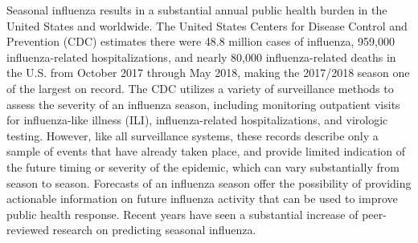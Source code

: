 \documentclass{article}\usepackage[]{graphicx}\usepackage[]{color}
\begin{document}
% 




Seasonal influenza results in a substantial annual public health burden in the United States and worldwide.
The United States Centers for Disease Control and Prevention (CDC) estimates there were 48.8 million cases of influenza, 959,000 influenza-related hospitalizations, and nearly 80,000 influenza-related deaths in the U.S. from October 2017 through May 2018, making the 2017/2018 season one of the largest on record.\cite{CDC2018-estimates} 
The CDC utilizes a variety of surveillance methods to assess the severity of an influenza season, including monitoring outpatient visits for influenza-like illness (ILI), influenza-related hospitalizations, and virologic testing.\cite{surv2017} 
However, like all surveillance systems, these records describe only a sample of events that have already taken place, and provide limited indication of the future timing or severity of the epidemic, which can vary substantially from season to season.\cite{CDC2018} 
Forecasts of an influenza season offer the possibility of providing actionable information on future influenza activity that can be used to improve public health response. 
Recent years have seen a substantial increase of peer-reviewed research on predicting seasonal influenza.\cite{Shaman2013,Yang2014,Yang2015,Chretien2016,Kandula2017,osthus2018dynamic,Brooks2018,Pei2018}
\end{document}
